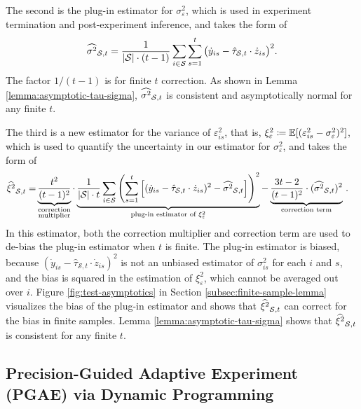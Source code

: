 The second is the plug-in estimator for $\sigma^2_\varepsilon$, which is used in experiment termination and post-experiment inference, and takes the form of
\begin{equation}
     \widehat{\sigma^2}_{\mathcal{S},t} = \frac{1}{|\mathcal{S}| \cdot (t-1)} \sum_{i \in \mathcal{S}} \sum_{s = 1}^t \big( \dot{y}_{is} - \hat{\tau}_{\mathcal{S},t} \cdot \dot{z}_{is} \big)^2. \label{eqn:second-moment-sigma-estimator} 
\end{equation}
The factor $1/(t-1)$ is for finite $t$ correction. As shown in Lemma \ref{lemma:asymptotic-tau-sigma}, $\widehat{\sigma^2}_{\mathcal{S},t}$ is consistent and asymptotically normal for any finite $t$.

The third is a new estimator for the variance of $\varepsilon_{is}^2$, that is, $\xi^2_\varepsilon \coloneqq \mathbb{E}[(\varepsilon^2_{is} - \sigma^2_\varepsilon)^2]$, which is used to quantify the uncertainty in our estimator for $\sigma^2_\varepsilon$, and takes the form of
\begin{align}
    \widehat{\xi^2}_{\mathcal{S},t} =& \underbrace{\frac{t^2}{(t-1)^2}}_{\substack{\text{correction}\\\text{multiplier}}}  \cdot \underbrace{\frac{1}{|\mathcal{S}| \cdot t}  \sum_{i \in \mathcal{S}}  \left(\sum_{s=1}^t \left[ (\dot{y}_{is} - \hat{\tau}_{\mathcal{S},t} \cdot \dot{z}_{is})^2 - \widehat{\sigma^2}_{\mathcal{S},t} \right] \right)^2}_{\text{plug-in estimator of } \xi^2_\varepsilon}  - \underbrace{\frac{3t-2}{(t-1)^2} \cdot (\widehat{\sigma^2}_{\mathcal{S},t})^2}_{\text{correction term}} \, . \label{eqn:fourth-moment-sigma-estimator}
\end{align}
In this estimator, both the correction multiplier and correction term are used to de-bias the plug-in estimator when $t$ is finite. The plug-in estimator is biased, because $(\dot{y}_{is} - \hat{\tau}_{\mathcal{S},t} \cdot \dot{z}_{is})^2$ is not an unbiased estimator of $\sigma^2_{is}$ for each $i$ and $s$, and the bias is squared in the estimation of $\xi_\varepsilon^2$, which cannot be averaged out over $i$. Figure \ref{fig:test-asymptotics} in Section \ref{subsec:finite-sample-lemma} visualizes the bias of the plug-in estimator and shows that $\widehat{\xi^2}_{\mathcal{S},t}$ can correct for the bias in finite samples. Lemma \ref{lemma:asymptotic-tau-sigma} shows that $\widehat{\xi^2}_{\mathcal{S},t}$ is consistent for any finite $t$.


\subsection{Precision-Guided Adaptive Experiment (PGAE) via Dynamic Programming}\label{subsec:adaptive-algorithm}


